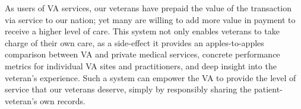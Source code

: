 %
%
%

As users of VA services, our veterans have prepaid the value of the transaction via service to our nation; yet many are willing to add more value in payment to receive a higher level of care.
This system not only enables veterans to take charge of their own care, as a side-effect it provides an apples-to-apples comparison between VA and private medical services, concrete performance metrics for individual VA sites and practitioners, and deep insight into the veteran's experience.
Such a system can empower the VA to provide the level of service that our veterans deserve, simply by responsibly sharing the patient-veteran's own records.
